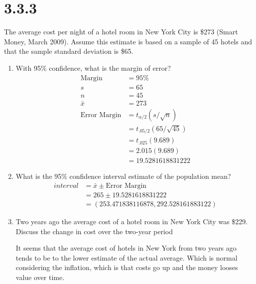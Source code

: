 \documentclass{article}
\begin{document}
\section*{3.3.3}
The average cost per night of a hotel room in New York City is \$273 (Smart Money, March 2009). Assume this estimate is based on a sample of 45 hotels and that the sample standard deviation is \$65.
\begin{enumerate}
  \item With 95\% confidence, what is the margin of error?
  \begin{align*}
    \text{Margin} &= 95\%\\
    s &= 65\\
    n &= 45\\
    \bar{x} &= 273\\
    \text{Error Margin} &= t_{\alpha/2}(s/ \sqrt{n})\\
    &=t_{.05/2}(65/ \sqrt{45})\\
    &=t_{.025}(9.689)\\
    &=2.015(9.689)\\
    &=19.5281618831222
  \end{align*}
  
  \item What is the 95\% confidence interval estimate of the population mean?
  \begin{align*}
    interval &= \bar{x} \pm \text{Error Margin}\\
    &= 265 \pm 19.5281618831222\\
    &= (253.471838116878, 292.528161883122)
  \end{align*}

  \item Two years ago the average cost of a hotel room in New York City was \$229. Discuss the change in cost over the two-year period
  
  It seems that the average cost of hotels in New York from two years ago tends to be to the lower estimate of the actual average. Which is normal considering the inflation, which is that costs go up and the money looses value over time.
\end{enumerate}
\end{document}
